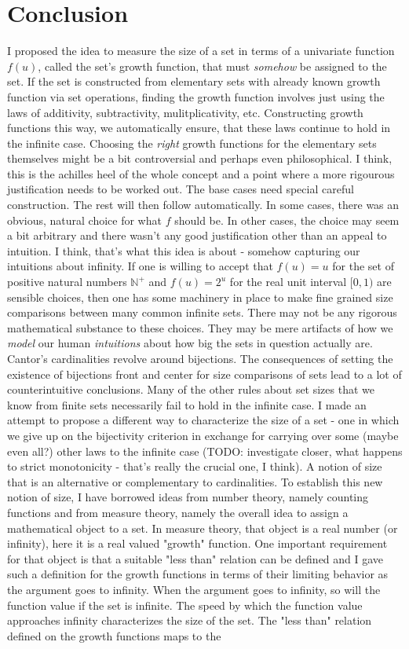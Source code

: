 \documentclass[12pt]{article}
\begin{document}
\section{Conclusion}
I proposed the idea to measure the size of a set in terms of a univariate function $f(u)$, called the set's growth function, that must \emph{somehow} be assigned to the set. If the set is constructed from elementary sets with already known growth function via set operations, finding the growth function involves just using the laws of additivity, subtractivity, mulitplicativity, etc. Constructing growth functions this way, we automatically ensure, that these laws continue to hold in the infinite case. Choosing the \emph{right} growth functions for the elementary sets themselves might be a bit controversial and perhaps even philosophical. I think, this is the achilles heel of the whole concept and a point where a more rigourous justification needs to be worked out. The base cases need special careful construction. The rest will then follow automatically. In some cases, there was an obvious, natural choice for what $f$ should be. In other cases, the choice may seem a bit arbitrary and there wasn't any good justification other than an appeal to intuition. I think, that's what this idea is about - somehow capturing our intuitions about infinity. If one is willing to accept that $f(u) = u$ for the set of positive natural numbers $\mathbb{N}^+$ and $f(u) = 2^u$ for the real unit interval $[0,1)$ are sensible choices, then one has some machinery in place to make fine grained size comparisons between many common infinite sets. There may not be any rigorous mathematical substance to these choices. They may be mere artifacts of how we \emph{model} our human \emph{intuitions} about how big the sets in question actually are. Cantor's cardinalities revolve around bijections. The consequences of setting the existence of bijections front and center for size comparisons of sets lead to a lot of counterintuitive conclusions. Many of the other rules about set sizes that we know from finite sets necessarily fail to hold in the infinite case. I made an attempt to propose a different way to characterize the size of a set - one in which we give up on the bijectivity criterion in exchange for carrying over some (maybe even all?) other laws to the infinite case (TODO: investigate closer, what happens to strict monotonicity - that's really the crucial one, I think). A notion of size that is an alternative or complementary to cardinalities. To establish this new notion of size, I have borrowed ideas from number theory, namely counting functions and from measure theory, namely the overall idea to assign a mathematical object to a set. In measure theory, that object is a real number (or infinity), here it is a real valued "growth" function. One important requirement for that object is that a suitable "less than" relation can be defined and I gave such a definition for the growth functions in terms of their limiting behavior as the argument goes to infinity. When the argument goes to infinity, so will the function value if the set is infinite. The speed by which the function value approaches infinity characterizes the size of the set. The "less than" relation defined on the growth functions maps to the 
\end{document}
